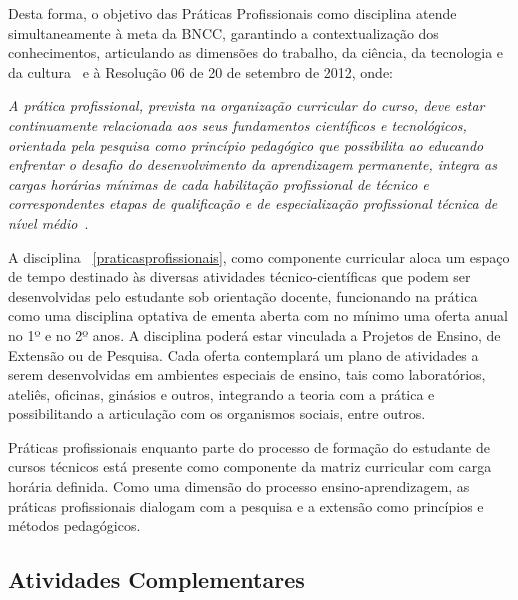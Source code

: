 \documentclass[11pt,fleqn]{book} %
\renewenvironment{quote}
{\small\list{}{\rightmargin=.1cm \leftmargin=2.5cm}%
	\item\relax}
{\endlist}
\begin{document}
Desta forma, o objetivo das Práticas Profissionais como disciplina atende simultaneamente à meta da BNCC, garantindo a contextualização dos conhecimentos, articulando as dimensões do trabalho, da ciência, da tecnologia e da cultura~\cite{BNCC2019} e à Resolução 06 de 20 de setembro de 2012, onde:
\begin{quote}
	\textit{A prática profissional, prevista na organização curricular do curso, deve estar continuamente relacionada aos seus fundamentos científicos e tecnológicos, orientada pela pesquisa como princípio pedagógico que possibilita ao educando enfrentar o desafio do desenvolvimento da aprendizagem permanente, integra as cargas horárias mínimas de cada habilitação profissional de técnico e correspondentes etapas de qualificação e de especialização profissional técnica de nível médio}~\cite{Resolucao06De2012}.
\end{quote}

A disciplina ~\ref{praticasprofissionais}, como componente curricular aloca um espaço de tempo destinado às diversas atividades técnico-científicas que podem ser desenvolvidas pelo estudante sob orientação docente, funcionando na prática como uma disciplina optativa de ementa aberta com no mínimo uma oferta anual no 1º e no 2º anos.
A disciplina poderá estar vinculada a Projetos de Ensino, de Extensão ou de Pesquisa.
Cada oferta contemplará um plano de atividades a serem desenvolvidas em ambientes especiais de ensino, tais como laboratórios, ateliês, oficinas, ginásios e outros, integrando a teoria com a prática e possibilitando a articulação com os organismos sociais, entre outros.

Práticas profissionais enquanto parte do processo de formação do estudante de cursos técnicos está presente como componente da matriz curricular com carga horária definida.
Como uma dimensão do processo ensino-aprendizagem, as práticas profissionais dialogam com a pesquisa e a extensão como princípios e métodos pedagógicos. 

\subsection{Atividades Complementares}\label{atividadescomplementares}
\indent
\end{document}
